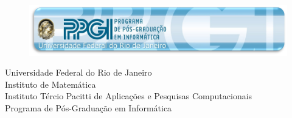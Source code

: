   \begin{capa}%
    \begin{figure}[h!]%
        \centering%
        \includegraphics[scale=1]{figs/banner.png}
      \end{figure}%
    \center
	\ABNTEXchapterfont\large{Universidade Federal do Rio de Janeiro\\
    Instituto de Matemática\\
    Instituto Tércio Pacitti de Aplicações e Pesquisas Computacionais\\
    Programa de Pós-Graduação em Informática}

    \vfill
    \ABNTEXchapterfont\bfseries\LARGE\imprimirtitulo
    \vfill

	\ABNTEXchapterfont\large\imprimirautor
	\vfill
%
	
    \large\imprimirlocal
    \\\large\imprimirdata

    \vspace*{1cm}
  \end{capa}
